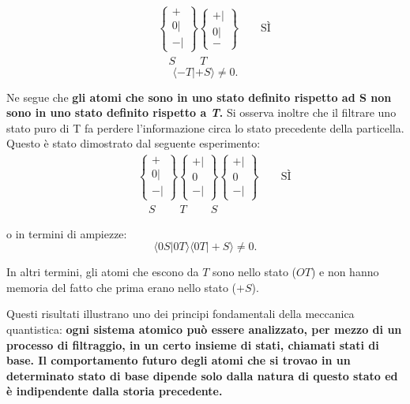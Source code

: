 \documentclass[a4paper,12pt,oneside]{book}
\begin{document}
\begin{eqnarray}
& & \begin{Bmatrix}
 + \\ 0 | \\ - |  
\end{Bmatrix}
\begin{Bmatrix}
 + | \\ 0 | \\ -   
\end{Bmatrix} \qquad \text{SÌ} \\
& & \quad S  \ \qquad T \nonumber 
\label{SG7}
\end{eqnarray}
\begin{equation}
\langle -T | +S \rangle \neq 0 .
\end{equation}

Ne segue che \textbf{gli atomi che sono in uno stato definito rispetto ad S non sono in uno stato definito rispetto a \emph{T}.}
Si osserva inoltre che il filtrare uno stato puro di T fa perdere l'informazione circa lo stato precedente della particella. Questo è stato dimostrato dal seguente esperimento:
\begin{eqnarray}
& &\begin{Bmatrix}
 + \\ 0 | \\ - |  
\end{Bmatrix}
\begin{Bmatrix}
 + | \\ 0  \\ - |  
\end{Bmatrix}
\begin{Bmatrix}
 + | \\ 0  \\ - |  
\end{Bmatrix} \qquad \text{SÌ} \\
& & \quad S  \ \qquad T\ \qquad S \nonumber
\label{SG8}
\end{eqnarray}

o in termini di ampiezze:
\begin{equation}
\langle 0S | 0T \rangle \langle 0T | +S \rangle \neq 0 .
\end{equation}

In altri termini, gli atomi che escono da $T$ sono nello stato ($OT$) e non hanno memoria del fatto che prima erano nello stato ($+S$).

Questi risultati illustrano uno dei principi fondamentali della meccanica quantistica: \textbf{ogni sistema atomico può essere analizzato, per mezzo di un processo di filtraggio, in un certo insieme di stati, chiamati stati di base. Il comportamento futuro degli atomi che si trovao in un determinato stato di base dipende solo dalla natura di questo stato ed è indipendente dalla storia precedente.}
\end{document}
